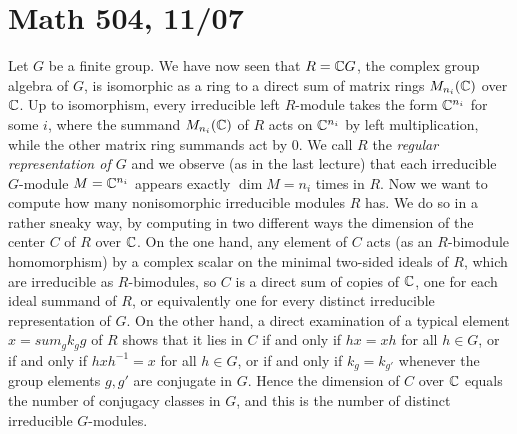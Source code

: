 \documentclass[10pt]{article}
\begin{document}
\section*{Math 504, 11/07}

Let $G$ be a finite group. We have now seen that $R=\Bbb CG$, the
complex group algebra of $G$, is isomorphic as a ring to a direct sum of
matrix rings $M_{n_i}(\Bbb C)$ over $\Bbb C$. Up to isomorphism, every
irreducible left $R$-module takes the form $\Bbb C^{n_i}$ for some $i$,
where the summand $M_{n_i}(\Bbb C)$ of $R$ acts on $\Bbb C^{n_i}$ by
left multiplication, while the other matrix ring summands act by 0. We
call $R$ the {\sl regular representation of $G$} and we observe (as in
the last lecture) that each irreducible $G$-module $M=\Bbb C^{n_i}$
appears exactly $\dim M = n_i$ times in $R$. Now we want to compute how
many nonisomorphic irreducible modules $R$ has. We do so in a rather
sneaky way, by computing in two different ways the dimension of the
center $C$ of $R$ over $\Bbb C$. On the one hand, any element of $C$
acts (as an $R$-bimodule homomorphism) by a complex scalar on the
minimal two-sided ideals of $R$, which are irreducible as $R$-bimodules,
so $C$ is a direct sum of copies of $\Bbb C$, one for each ideal summand
of $R$, or equivalently one for every distinct irreducible
representation of $G$. On the other hand, a direct examination of a
typical element $x=sum_g k_g g$ of $R$ shows that it lies in $C$ if and
only if $hx = xh$ for all $h\in G$, or if and only if $hxh^{-1} = x$ for
all $h\in G$, or if and only if $k_g = k_{g'}$ whenever the group
elements $g,g'$ are conjugate in $G$. Hence the dimension of $C$ over
$\Bbb C$ equals the number of conjugacy classes in $G$, and this is the
number of distinct irreducible $G$-modules.
\end{document}
